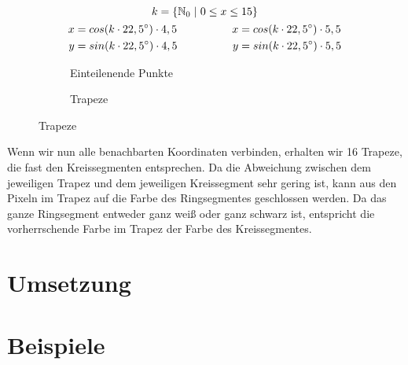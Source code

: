 \begin{gather}
k = \{\mathbb{N}_0 \hspace{0.3em}|\hspace{0.3em} 0 \le x \le 15\} \\
\begin{split}
x &= cos(k \cdot 22,5^{\circ}) \cdot 4,5 \\
y &= sin(k \cdot 22,5^{\circ}) \cdot 4,5
\end{split}
\hspace{5em}
\begin{split}
x &= cos(k \cdot 22,5^{\circ}) \cdot 5,5 \\
y &= sin(k \cdot 22,5^{\circ}) \cdot 5,5
\end{split}
\end{gather}

\begin{figure}[!ht]
	\begin{subfigure}[b]{0.5\textwidth}
		\centering	
		
		\caption{Einteilenende Punkte}
	\end{subfigure}
	\begin{subfigure}[b]{0.5\textwidth}
		\centering	
		
		\caption{Trapeze}
	\end{subfigure}
\end{figure}

Wenn wir nun alle benachbarten Koordinaten verbinden, erhalten wir 16 Trapeze, die fast den Kreissegmenten entsprechen. Da die Abweichung zwischen dem jeweiligen Trapez und dem jeweiligen Kreissegment sehr gering ist, kann aus den Pixeln im Trapez auf die Farbe des Ringsegmentes geschlossen werden. Da das ganze Ringsegment entweder ganz weiß oder ganz schwarz ist, entspricht die vorherrschende Farbe im Trapez der Farbe des Kreissegmentes.
\section{Umsetzung}
\section{Beispiele}